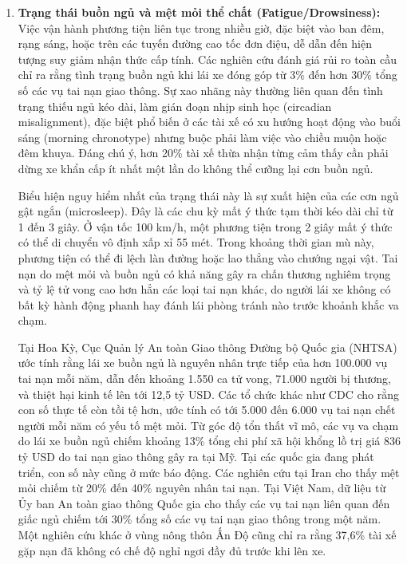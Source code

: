 \documentclass[../DoAn.tex]{subfiles}
\begin{document}
\begin{enumerate}
    \item \textbf{Trạng thái buồn ngủ và mệt mỏi thể chất (Fatigue/Drowsiness):}\\
    Việc vận hành phương tiện liên tục trong nhiều giờ, đặc biệt vào ban đêm, rạng sáng, hoặc trên các tuyến đường cao tốc đơn điệu, dễ dẫn đến hiện tượng suy giảm nhận thức cấp tính. Các nghiên cứu đánh giá rủi ro toàn cầu chỉ ra rằng tình trạng buồn ngủ khi lái xe đóng góp từ 3\% đến hơn 30\% tổng số các vụ tai nạn giao thông. Sự xao nhãng này thường liên quan đến tình trạng thiếu ngủ kéo dài, làm gián đoạn nhịp sinh học (circadian misalignment), đặc biệt phổ biến ở các tài xế có xu hướng hoạt động vào buổi sáng (morning chronotype) nhưng buộc phải làm việc vào chiều muộn hoặc đêm khuya. Đáng chú ý, hơn 20\% tài xế thừa nhận từng cảm thấy cần phải dừng xe khẩn cấp ít nhất một lần do không thể cưỡng lại cơn buồn ngủ.
    
    Biểu hiện nguy hiểm nhất của trạng thái này là sự xuất hiện của các cơn ngủ gật ngắn (microsleep). Đây là các chu kỳ mất ý thức tạm thời kéo dài chỉ từ 1 đến 3 giây. Ở vận tốc 100 km/h, một phương tiện trong 2 giây mất ý thức có thể di chuyển vô định xấp xỉ 55 mét. Trong khoảng thời gian mù này, phương tiện có thể đi lệch làn đường hoặc lao thẳng vào chướng ngại vật. Tai nạn do mệt mỏi và buồn ngủ có khả năng gây ra chấn thương nghiêm trọng và tỷ lệ tử vong cao hơn hẳn các loại tai nạn khác, do người lái xe không có bất kỳ hành động phanh hay đánh lái phòng tránh nào trước khoảnh khắc va chạm.
    
    Tại Hoa Kỳ, Cục Quản lý An toàn Giao thông Đường bộ Quốc gia (NHTSA) ước tính rằng lái xe buồn ngủ là nguyên nhân trực tiếp của hơn 100.000 vụ tai nạn mỗi năm, dẫn đến khoảng 1.550 ca tử vong, 71.000 người bị thương, và thiệt hại kinh tế lên tới 12,5 tỷ USD. Các tổ chức khác như CDC cho rằng con số thực tế còn tồi tệ hơn, ước tính có tới 5.000 đến 6.000 vụ tai nạn chết người mỗi năm có yếu tố mệt mỏi. Từ góc độ tổn thất vĩ mô, các vụ va chạm do lái xe buồn ngủ chiếm khoảng 13\% tổng chi phí xã hội khổng lồ trị giá 836 tỷ USD do tai nạn giao thông gây ra tại Mỹ. Tại các quốc gia đang phát triển, con số này cũng ở mức báo động. Các nghiên cứu tại Iran cho thấy mệt mỏi chiếm từ 20\% đến 40\% nguyên nhân tai nạn. Tại Việt Nam, dữ liệu từ Ủy ban An toàn giao thông Quốc gia cho thấy các vụ tai nạn liên quan đến giấc ngủ chiếm tới 30\% tổng số các vụ tai nạn giao thông trong một năm. Một nghiên cứu khác ở vùng nông thôn Ấn Độ cũng chỉ ra rằng 37,6\% tài xế gặp nạn đã không có chế độ nghỉ ngơi đầy đủ trước khi lên xe.


\end{enumerate}
\end{document}
